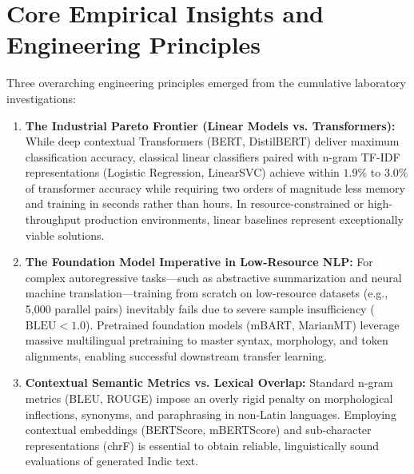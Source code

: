 \section{Core Empirical Insights and Engineering Principles}
Three overarching engineering principles emerged from the cumulative laboratory investigations:
\begin{enumerate}
    \item \textbf{The Industrial Pareto Frontier (Linear Models vs. Transformers):} While deep contextual Transformers (BERT, DistilBERT) deliver maximum classification accuracy, classical linear classifiers paired with n-gram TF-IDF representations (Logistic Regression, LinearSVC) achieve within $1.9\%$ to $3.0\%$ of transformer accuracy while requiring two orders of magnitude less memory and training in seconds rather than hours. In resource-constrained or high-throughput production environments, linear baselines represent exceptionally viable solutions.
    \item \textbf{The Foundation Model Imperative in Low-Resource NLP:} For complex autoregressive tasks—such as abstractive summarization and neural machine translation—training from scratch on low-resource datasets (e.g., 5,000 parallel pairs) inevitably fails due to severe sample insufficiency ($\text{BLEU} < 1.0$). Pretrained foundation models (mBART, MarianMT) leverage massive multilingual pretraining to master syntax, morphology, and token alignments, enabling successful downstream transfer learning.
    \item \textbf{Contextual Semantic Metrics vs. Lexical Overlap:} Standard n-gram metrics (BLEU, ROUGE) impose an overly rigid penalty on morphological inflections, synonyms, and paraphrasing in non-Latin languages. Employing contextual embeddings (BERTScore, mBERTScore) and sub-character representations (chrF) is essential to obtain reliable, linguistically sound evaluations of generated Indic text.
\end{enumerate}


